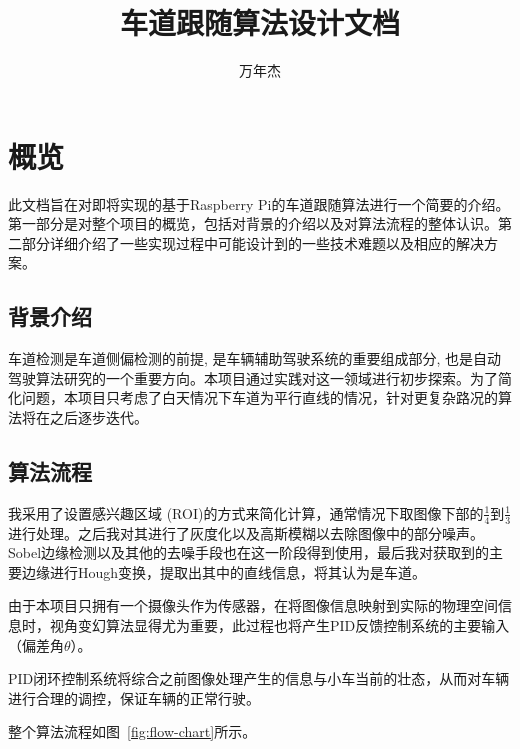 \documentclass[11pt]{article}
\title{车道跟随算法设计文档}
\author{万年杰}
\begin{document}
\maketitle
\newpage

\section{概览}
此文档旨在对即将实现的基于Raspberry Pi的车道跟随算法进行一个简要的介绍。第一部分是对整个项目的概览，包括对背景的介绍以及对算法流程的整体认识。第二部分详细介绍了一些实现过程中可能设计到的一些技术难题以及相应的解决方案。

\subsection{背景介绍}
车道检测是车道侧偏检测的前提, 是车辆辅助驾驶系统的重要组成部分, 也是自动驾驶算法研究的一个重要方向。本项目通过实践对这一领域进行初步探索。为了简化问题，本项目只考虑了白天情况下车道为平行直线的情况，针对更复杂路况的算法将在之后逐步迭代。

\subsection{算法流程}
我采用了设置感兴趣区域 (ROI)的方式来简化计算，通常情况下取图像下部的$\frac{1}{4}$到$\frac{1}{3}$进行处理。之后我对其进行了灰度化以及高斯模糊以去除图像中的部分噪声。Sobel边缘检测以及其他的去噪手段也在这一阶段得到使用，最后我对获取到的主要边缘进行Hough变换，提取出其中的直线信息，将其认为是车道。

由于本项目只拥有一个摄像头作为传感器，在将图像信息映射到实际的物理空间信息时，视角变幻算法显得尤为重要，此过程也将产生PID反馈控制系统的主要输入（偏差角$\theta$）。

PID闭环控制系统将综合之前图像处理产生的信息与小车当前的壮态，从而对车辆进行合理的调控，保证车辆的正常行驶。

整个算法流程如图~\ref{fig:flow-chart}所示。
\end{document}
